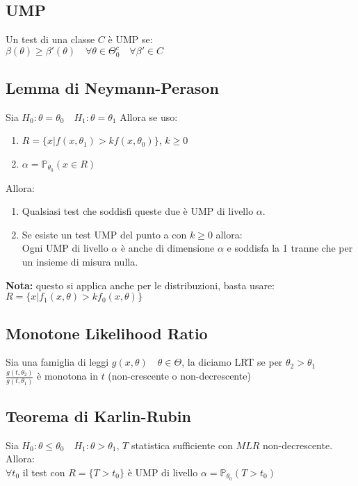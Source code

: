 \documentclass[a4paper,notitlepage]{report}%
\newcommand{\p}{\mathbb{P}} %
\begin{document}
\begin{multicols*}{2}
    \subsection*{UMP}
    Un test di una classe $C$ è UMP se:\\
    $\beta(\theta)\geq\beta'(\theta) \quad \forall\theta\in\Theta_0^c\quad \forall \beta'\in C$


    \subsection*{Lemma di Neymann-Perason}
    Sia $H_0: \theta = \theta_0 \quad H_1: \theta = \theta_1$
    Allora se uso:
    \begin{enumerate}
        \item $R=\{x| f(x,\theta_1)>kf(x,\theta_0) \}$, $k\geq0$
        \item $\alpha = \p_{\theta_0}(x\in R)$
    \end{enumerate}
    Allora:
    \begin{enumerate}[label=\alph*]
        \item Qualsiasi test che soddisfi queste due è UMP
            di livello $\alpha$.
        \item Se esiste un test UMP del punto a con $k\geq0$ allora:\\
            Ogni UMP di livello $\alpha$ è anche di dimensione $\alpha$
            e soddisfa la 1 tranne che per un insieme di misura nulla.
    \end{enumerate}
    \textbf{Nota:} questo si applica anche per le distribuzioni, 
    basta usare: \\
    $R=\{x| f_1(x,\theta)>kf_0(x,\theta) \}$
    

    \subsection*{Monotone Likelihood Ratio}
    Sia una famiglia di leggi $g(x,\theta) \quad\theta\in\Theta$,
    la diciamo LRT se per $\theta_2 > \theta_1$ \\
    $\frac{ g(t,\theta_2 )}{g(t,\theta_1 )}$ è monotona in $t$ (non-crescente o non-decrescente)


    \subsection*{Teorema di Karlin-Rubin}
    Sia $H_0: \theta \leq \theta_0 \quad H_1: \theta > \theta_1$,
    $T$ statistica sufficiente con $MLR$ non-decrescente. Allora: \\
    $\forall t_0$ il test con $R=\{ T > t_0 \}$ è UMP di livello
    $\alpha= \p_{\theta_0}(T>t_0)$


\end{multicols*}
\end{document}
